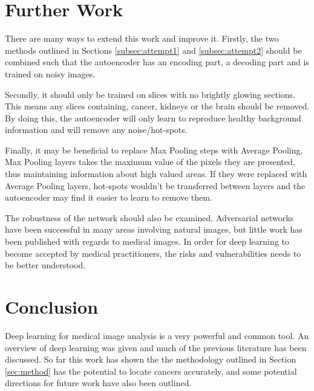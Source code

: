 \section{Further Work}
There are many ways to extend this work and improve it.
Firstly, the two methods outlined in Sections \ref{subsec:attempt1} and \ref{subsec:attempt2} should be combined such that the autoencoder has an encoding part, a decoding part and is trained on noisy images.

Secondly, it should only be trained on slices with no brightly glowing sections.
This means any slices containing, cancer, kidneys or the brain should be removed.
By doing this, the autoencoder will only learn to reproduce healthy background information and will remove any noise/hot-spots.

Finally, it may be beneficial to replace Max Pooling steps with Average Pooling.
Max Pooling layers takes the maximum value of the pixels they are presented, thus maintaining information about high valued areas.
If they were replaced with Average Pooling layers, hot-spots wouldn't be transferred between layers and the autoencoder may find it easier to learn to remove them.

The robustness of the network should also be examined.
Adversarial networks have been successful in many areas involving natural images, but little work has been published with regards to medical images.
In order for deep learning to become accepted by medical practitioners, the risks and vulnerabilities needs to be better understood.

\section{Conclusion}
Deep learning for medical image analysis is a very powerful and common tool.
An overview of deep learning was given and much of the previous literature has been discussed.
So far this work has shown the the methodology outlined in Section \ref{sec:method} has the potential to locate cancers accurately, and some potential directions for future work have also been outlined.